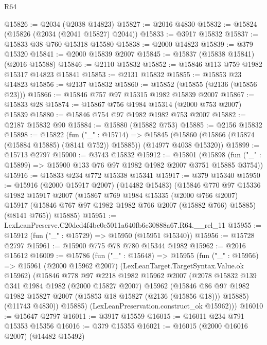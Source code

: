 \begin{lexlean}{R64}
\begin{coremodule}
@15826 := @2034 (@2038 @14823)
@15827 := @2016 @4830
@15832 := @15824 (@15826 (@2034 (@2041 @15827) @2044))
@15833 := @3917 @15832
@15837 := @15833 @38 @760 @15318 @15580
@15838 := @2000 @14823
@15839 := @379 @15320
@15841 := @2000 @15839 @2007
@15845 := @15837 (@15838 @15841) (@2016 @15588)
@15846 := @2110 @15832
@15852 := @15846 @113 @759 @1982 @15317 @14823 @15841
@15853 := @2131 @15832
@15855 := @15853 @23 @14823
@15856 := @2137 @15832
@15860 := @15852 (@15855 (@2136 (@15856 @23)))
@15866 := @15846 @757 @97 @15315 @1982 @15839 @2007
@15867 := @15833 @28
@15874 := @15867 @756 @1984 @15314 (@2000 @753 @2007) @15839
@15880 := @15846 @754 @97 @1982 @1982 @753 @2007
@15882 := @2187 @15832 @90
@15884 := @15880 (@15882 @753)
@15885 := @2156 @15832
@15898 := @15822
    (fun ("_" : @15714) =>
    @15845 (@15860 (@15866 (@15874 (@15884 @15885) (@8141 @752)) @15885)) (@14977 @4038 @15320))
@15899 := @15713 @2797
@15900 := @3743 @15832
@15912 := @15801
    (@15898 (fun ("_" : @15899) => @15900 @133 @76 @97 @1982 @1982 @2007 @3751 @15885 @3754))
@15916 := @15833 @234 @772 @15338 @15341
@15917 := @379 @15340
@15950 := @15916
    (@2000 @15917 @2007)
    (@14482 @15483)
    (@15846
      @770
      @97
      @15336
      @1982
      @15917
      @2007
      (@15867
        @769
        @1984
        @15335
        (@2000 @766 @2007)
        @15917
        (@15846 @767 @97 @1982 @1982 @766 @2007 (@15882 @766) @15885)
        (@8141 @765))
      @15885)
@15951 := LexLeanPreserve.C20ded4f4be0e5011a640fb6c30888a67.R64.__rel_11
@15955 := @15912 (fun ("_" : @15729) => @15950 (@15951 @15340))
@15956 := @15728 @2797
@15961 := @15900 @775 @78 @780 @15344 @1982
@15962 := @2016 @15612
@16009 := @15786
    (fun ("_" : @15648) =>
    @15955
      (fun ("_" : @15956) =>
      @15961
        (@2000 @15962 @2007)
        (LexLeanTarget.TargetSyntax.Value.ok @15962)
        (@15846
          @778
          @97
          @2218
          @1982
          @15962
          @2007
          (@2078
            @15832
            @139
            @341
            @1984
            @1982
            (@2000 @15827 @2007)
            @15962
            (@15846
              @86
              @97
              @1982
              @1982
              @15827
              @2007
              (@15853 @18 @15827 (@2136 (@15856 @18)))
              @15885)
            (@11743 @4830))
          @15885)
        (LexLeanPreservation.construct_ok @15962)))
@16010 := @15647 @2797
@16011 := @3917 @15559
@16015 := @16011 @234 @791 @15353 @15356
@16016 := @379 @15355
@16021 := @16015 (@2000 @16016 @2007) (@14482 @15492)

\end{coremodule}
\end{lexlean}
